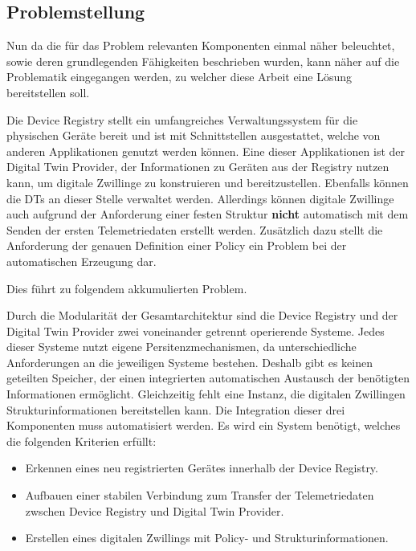 \subsection{Problemstellung}

Nun da die für das Problem relevanten Komponenten einmal näher beleuchtet, sowie deren grundlegenden Fähigkeiten beschrieben wurden, kann näher auf die Problematik eingegangen werden, zu welcher diese Arbeit eine Lösung bereitstellen soll. 

\pagebreak

Die Device Registry stellt ein umfangreiches Verwaltungssystem für die physischen Geräte bereit und ist mit Schnittstellen ausgestattet, welche von anderen Applikationen genutzt werden können. Eine dieser Applikationen ist der Digital Twin Provider, der Informationen zu Geräten aus der Registry nutzen kann, um digitale Zwillinge zu konstruieren und bereitzustellen. Ebenfalls können die \ac{DT}s an dieser Stelle verwaltet werden. Allerdings können digitale Zwillinge auch aufgrund der Anforderung einer festen Struktur \textbf{nicht} automatisch mit dem Senden der ersten Telemetriedaten erstellt werden. Zusätzlich dazu stellt die Anforderung der genauen Definition einer Policy ein Problem bei der automatischen Erzeugung dar.

Dies führt zu folgendem akkumulierten Problem.

\begin{problem}
    Durch die Modularität der Gesamtarchitektur sind die Device Registry und der Digital Twin Provider zwei voneinander getrennt operierende Systeme. Jedes dieser Systeme nutzt eigene Persitenzmechanismen, da unterschiedliche Anforderungen an die jeweiligen Systeme bestehen. Deshalb gibt es keinen geteilten Speicher, der einen integrierten automatischen Austausch der benötigten Informationen ermöglicht. Gleichzeitig fehlt eine Instanz, die digitalen Zwillingen Strukturinformationen bereitstellen kann. Die Integration dieser drei Komponenten muss automatisiert werden. Es wird ein System benötigt, welches die folgenden Kriterien erfüllt:

    \begin{itemize}
        \item Erkennen eines neu registrierten Gerätes innerhalb der Device Registry.
        \item Aufbauen einer stabilen Verbindung zum Transfer der Telemetriedaten zwschen Device Registry und Digital Twin Provider.
        \item Erstellen eines digitalen Zwillings mit Policy- und Strukturinformationen.
    \end{itemize}
\end{problem}


